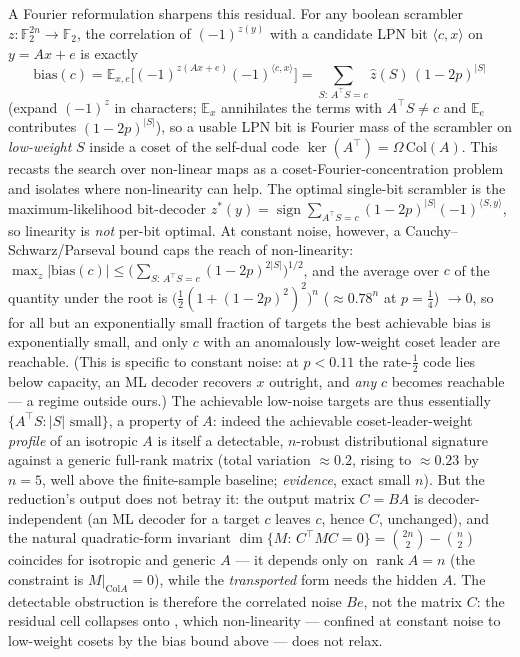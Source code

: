 \documentclass[11pt,a4paper]{article}
\theoremstyle{plain}
\theoremstyle{definition}
\newcommand{\F}{\mathbb{F}}
\newcommand{\E}{\mathbb{E}}
\begin{document}
A Fourier reformulation sharpens this residual. For any boolean scrambler $z:\F_2^{2n}\to\F_2$, the correlation of $(-1)^{z(y)}$ with a candidate LPN bit $\langle c,x\rangle$ on $y=Ax+e$ is exactly
\[
\mathrm{bias}(c)=\E_{x,e}\bigl[(-1)^{z(Ax+e)}(-1)^{\langle c,x\rangle}\bigr]=\sum_{S:\,A^{\top}S=c}\hat z(S)\,(1-2p)^{|S|}
\]
(expand $(-1)^z$ in characters; $\E_x$ annihilates the terms with $A^{\top}S\neq c$ and $\E_e$ contributes $(1-2p)^{|S|}$), so a usable LPN bit is Fourier mass of the scrambler on \emph{low-weight} $S$ inside a coset of the self-dual code $\ker(A^{\top})=\Omega\,\mathrm{Col}(A)$. This recasts the search over non-linear maps as a coset-Fourier-concentration problem and isolates where non-linearity can help. The optimal single-bit scrambler is the maximum-likelihood bit-decoder $z^\ast(y)=\operatorname{sign}\sum_{A^{\top}S=c}(1-2p)^{|S|}(-1)^{\langle S,y\rangle}$, so linearity is \emph{not} per-bit optimal. At constant noise, however, a Cauchy--Schwarz/Parseval bound caps the reach of non-linearity: $\max_z|\mathrm{bias}(c)|\le\bigl(\sum_{S:\,A^{\top}S=c}(1-2p)^{2|S|}\bigr)^{1/2}$, and the average over $c$ of the quantity under the root is $\bigl(\tfrac12(1+(1-2p)^2)^2\bigr)^{n}$ ($\approx 0.78^{n}$ at $p=\tfrac14$) $\to 0$, so for all but an exponentially small fraction of targets the best achievable bias is exponentially small, and only $c$ with an anomalously low-weight coset leader are reachable. (This is specific to constant noise: at $p<0.11$ the rate-$\tfrac12$ code lies below capacity, an ML decoder recovers $x$ outright, and \emph{any} $c$ becomes reachable --- a regime outside ours.) The achievable low-noise targets are thus essentially $\{A^{\top}S:|S|\text{ small}\}$, a property of $A$: indeed the achievable coset-leader-weight \emph{profile} of an isotropic $A$ is itself a detectable, $n$-robust distributional signature against a generic full-rank matrix (total variation $\approx 0.2$, rising to $\approx 0.23$ by $n=5$, well above the finite-sample baseline; \emph{evidence}, exact small $n$). But the reduction's output does not betray it: the output matrix $C=BA$ is decoder-independent (an ML decoder for a target $c$ leaves $c$, hence $C$, unchanged), and the natural quadratic-form invariant $\dim\{M:\,C^{\top}MC=0\}=\binom{2n}{2}-\binom{n}{2}$ coincides for isotropic and generic $A$ --- it depends only on $\operatorname{rank}A=n$ (the constraint is $M|_{\mathrm{Col}A}=0$), while the \emph{transported} form needs the hidden $A$. The detectable obstruction is therefore the correlated noise $Be$, not the matrix $C$: the residual cell collapses onto , which non-linearity --- confined at constant noise to low-weight cosets by the bias bound above --- does not relax.
\end{document}
